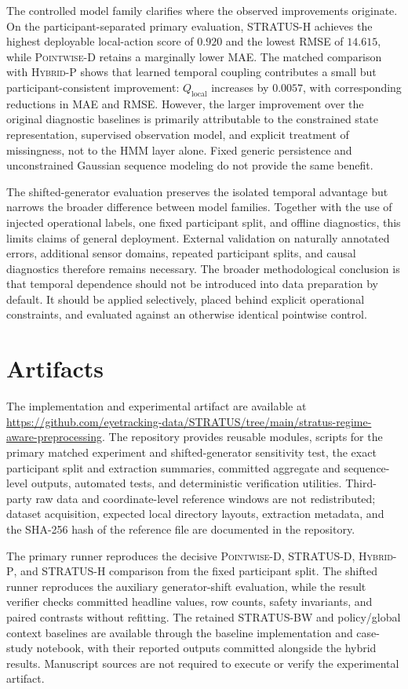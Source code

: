 \documentclass[sigconf,review]{acmart}
\newcommand{\methodP}{\textsc{Pointwise-D}\xspace}
\newcommand{\methodD}{\textsc{STRATUS-D}\xspace}
\newcommand{\methodBW}{\textsc{STRATUS-BW}\xspace}
\newcommand{\methodHP}{\textsc{Hybrid-P}\xspace}
\newcommand{\methodH}{\textsc{STRATUS-H}\xspace}
\begin{document}
The controlled model family clarifies where the observed improvements
originate. On the participant-separated primary evaluation, \methodH
achieves the highest deployable local-action score of \(0.920\) and the
lowest RMSE of \(14.615\), while \methodP retains a marginally lower MAE.
The matched comparison with \methodHP shows that learned temporal
coupling contributes a small but participant-consistent improvement:
\(Q_{\mathrm{local}}\) increases by \(0.0057\), with corresponding
reductions in MAE and RMSE. However, the larger improvement over the
original diagnostic baselines is primarily attributable to the
constrained state representation, supervised observation model, and
explicit treatment of missingness, not to the HMM layer alone. Fixed
generic persistence and unconstrained Gaussian sequence modeling do not
provide the same benefit.

The shifted-generator evaluation preserves the isolated temporal
advantage but narrows the broader difference between model families.
Together with the use of injected operational labels, one fixed
participant split, and offline diagnostics, this limits claims of
general deployment. External validation on naturally annotated errors,
additional sensor domains, repeated participant splits, and causal
diagnostics therefore remains necessary. The broader methodological
conclusion is that temporal dependence should not be introduced into
data preparation by default. It should be applied selectively, placed
behind explicit operational constraints, and evaluated against an
otherwise identical pointwise control.

\section{Artifacts}
\label{sec:artifacts}

The implementation and experimental artifact are available at
\url{https://github.com/eyetracking-data/STRATUS/tree/main/stratus-regime-aware-preprocessing}.
The repository provides reusable modules, scripts for the primary matched experiment and shifted-generator sensitivity test, the exact participant split and extraction summaries, committed aggregate and sequence-level outputs, automated tests, and deterministic verification utilities. Third-party raw data and coordinate-level reference windows are not redistributed; dataset acquisition, expected local directory layouts, extraction metadata, and the SHA-256 hash of the reference file are documented in the repository.

The primary runner reproduces the decisive \methodP, \methodD, \methodHP, and \methodH comparison from the fixed participant split. The shifted runner reproduces the auxiliary generator-shift evaluation, while the result verifier checks committed headline values, row counts, safety invariants, and paired contrasts without refitting. The retained \methodBW and policy/global context baselines are available through the baseline implementation and case-study notebook, with their reported outputs committed alongside the hybrid results. Manuscript sources are not required to execute or verify the experimental artifact.



\end{document}
